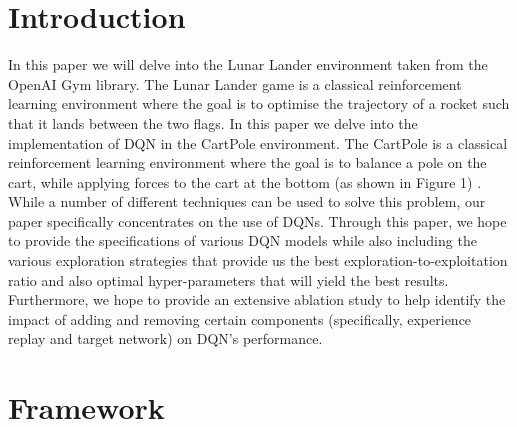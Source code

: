 \documentclass{article}
\begin{document}

\begin{abstract}

\end{abstract}

\section {Introduction}
In this paper we will delve into the Lunar Lander environment taken from the OpenAI Gym library. The Lunar Lander game is a classical reinforcement learning environment where the goal is to optimise the trajectory of a rocket such that it lands between the two flags.
In this paper we delve into the implementation of DQN in the CartPole environment. The CartPole is a classical reinforcement learning environment where the goal is to balance a pole on the cart, while  applying forces to the cart at the bottom (as shown in Figure 1) \citep{brockman2016openai}. While a number of different techniques can be used to solve this problem, our paper specifically concentrates on the use of DQNs. Through this paper, we hope to provide the specifications of various DQN models while also including the various exploration strategies that provide us the best exploration-to-exploitation ratio and also optimal hyper-parameters that will yield the best results. Furthermore, we hope to provide an extensive ablation study to help identify the impact of adding and removing certain components (specifically, experience replay and target network) on DQN's performance. \newline

\section{Framework}
\label{Introduction and General Strategy}
\end{document}
